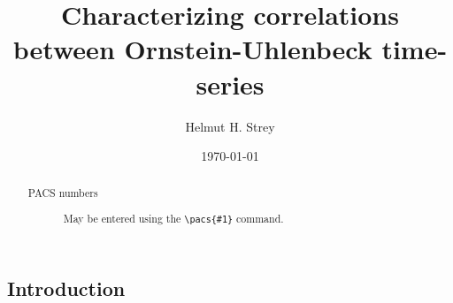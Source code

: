 \documentclass[%
 reprint,
 amsmath,amssymb,
 aps,
]{revtex4-1}
\begin{document}

\title{Characterizing correlations between Ornstein-Uhlenbeck time-series}

\author{Helmut H. Strey}

\date{\today}%

\begin{abstract}
\begin{description}
\item[PACS numbers]
May be entered using the \verb+\pacs{#1}+ command.
\end{description}
\end{abstract}

\maketitle

\onecolumngrid
\subsection{Introduction}
\end{document}
